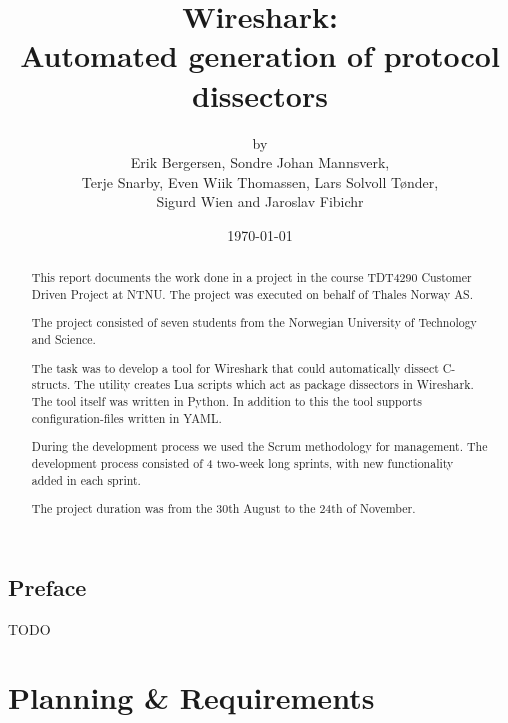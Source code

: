 \documentclass[a4paper, 11pt]{report}
\title{Wireshark:\\ Automated generation of protocol dissectors}
\author{by\\ Erik Bergersen, Sondre Johan Mannsverk,\\ Terje Snarby,
		Even Wiik Thomassen, Lars Solvoll Tønder,\\ Sigurd Wien
		and Jaroslav Fibichr}
\date{\today}
\begin{document}
\maketitle

\begin{abstract}
This report documents the work done in a project in the course TDT4290 
Customer Driven Project at NTNU. The project was executed on behalf of
Thales Norway AS.

The project consisted of seven students from the Norwegian University 
of Technology and Science.

The task was to develop a tool for Wireshark that could automatically
dissect C-structs. The utility creates Lua scripts which act as package
dissectors in Wireshark. The tool itself was written in Python. In addition 
to this the tool supports configuration-files written in YAML.

During the development process we used the Scrum methodology for
management. The development process consisted of 4 two-week long
sprints, with new functionality added in each sprint.

The project duration was from the 30th August to the 24th of November.
\end{abstract}

\chapter*{Preface}
TODO

\clearpage
{}
{}
\tableofcontents

\clearpage
{}
{}
\listoffigures

\clearpage
{}
{}
\listoftables


\clearpage
{}
\part{Planning \& Requirements}
\end{document}
